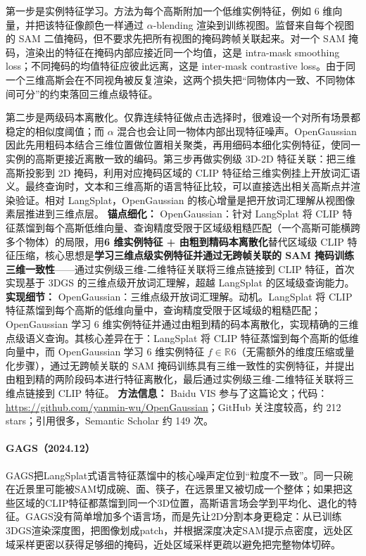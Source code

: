 第一步是实例特征学习。方法为每个高斯附加一个低维实例特征，例如 6 维向量，并把该特征像颜色一样通过 $\alpha$-blending 渲染到训练视图。监督来自每个视图的 SAM 二值掩码，但不要求先把所有视图的掩码跨帧关联起来。对一个 SAM 掩码，渲染出的特征在掩码内部应接近同一个均值，这是 intra-mask smoothing loss；不同掩码的均值特征应彼此远离，这是 inter-mask contrastive loss。由于同一个三维高斯会在不同视角被反复渲染，这两个损失把“同物体内一致、不同物体间可分”的约束落回三维点级特征。

第二步是两级码本离散化。仅靠连续特征做点击选择时，很难设一个对所有场景都稳定的相似度阈值；而 $\alpha$ 混合也会让同一物体内部出现特征噪声。OpenGaussian 因此先用粗码本结合三维位置做位置相关聚类，再用细码本细化实例特征，使同一实例的高斯更接近离散一致的编码。第三步再做实例级 3D-2D 特征关联：把三维高斯投影到 2D 掩码，利用对应掩码区域的 CLIP 特征给三维实例挂上开放词汇语义。最终查询时，文本和三维高斯的语言特征比较，可以直接选出相关高斯点并渲染验证。相对 LangSplat，OpenGaussian 的核心增量是把开放词汇理解从视图像素层推进到三维点层。
\textbf{锚点细化：} OpenGaussian：针对 LangSplat 将 CLIP 特征蒸馏到每个高斯低维向量、查询精度受限于区域级粗糙匹配（一个高斯可能横跨多个物体）的局限，用\textbf{6 维实例特征 + 由粗到精码本离散化}替代区域级 CLIP 特征压缩，核心思想是\textbf{学习三维点级实例特征并通过无跨帧关联的 SAM 掩码训练三维一致性}——通过实例级三维-二维特征关联将三维点链接到 CLIP 特征，首次实现基于 3DGS 的三维点级开放词汇理解，超越 LangSplat 的区域级查询能力。
\textbf{实现细节：} OpenGaussian：三维点级开放词汇理解。动机。LangSplat 将 CLIP 特征蒸馏到每个高斯的低维向量中，查询精度受限于区域级的粗糙匹配；OpenGaussian 学习 6 维实例特征并通过由粗到精的码本离散化，实现精确的三维点级语义查询。其核心差异在于：LangSplat 将 CLIP 特征蒸馏到每个高斯的低维向量中，而 OpenGaussian 学习 6 维实例特征 $f \in \mathbb{R}^{}6$（无需额外的维度压缩或量化步骤），通过无跨帧关联的 SAM 掩码训练具有三维一致性的实例特征，并提出由粗到精的两阶段码本进行特征离散化，最后通过实例级三维-二维特征关联将三维点链接到 CLIP 特征。
\textbf{方法信息：} Baidu VIS 参与了这篇论文；代码：\url{https://github.com/yanmin-wu/OpenGaussian}；GitHub 关注度较高，约 212 stars；引用很多，Semantic Scholar 约 149 次。



\paragraph{GAGS（2024.12）\cite{2412_13654}}
GAGS把LangSplat式语言特征蒸馏中的核心噪声定位到“粒度不一致”。同一只碗在近景里可能被SAM切成碗、面、筷子，在远景里又被切成一个整体；如果把这些区域的CLIP特征都蒸馏到同一个3D位置，高斯语言场会学到平均化、退化的特征。GAGS没有简单增加多个语言场，而是先让2D分割本身更稳定：从已训练3DGS渲染深度图，把图像划成patch，并根据深度决定SAM提示点密度，远处区域采样更密以获得足够细的掩码，近处区域采样更疏以避免把完整物体切碎。

